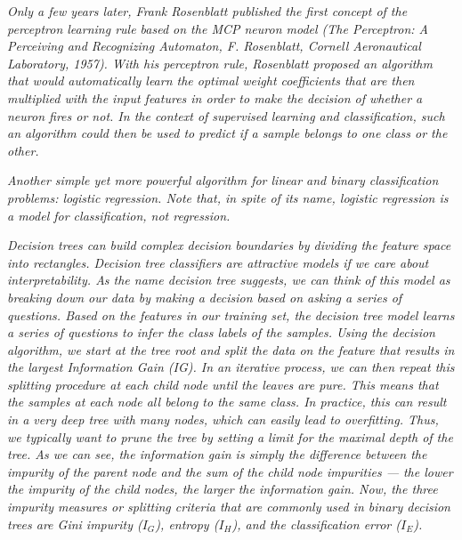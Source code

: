 \textit{Only a few years later, Frank Rosenblatt published the first concept of the perceptron learning rule based on the MCP neuron model (The Perceptron: A Perceiving and Recognizing Automaton, F. Rosenblatt, Cornell Aeronautical Laboratory, 1957). With his perceptron rule, Rosenblatt proposed an algorithm that would automatically learn the optimal weight coefficients that are then multiplied with the input features in order to make the decision of whether a neuron fires or not. In the context of supervised learning and classification, such an algorithm could then be used to predict if a sample belongs to one class or the other.}

\textit{Another simple yet more powerful algorithm for linear and binary classification problems: logistic regression. Note that, in spite of its name, logistic regression is a model for classification, not regression.}


\textit{Decision trees can build complex decision boundaries by dividing the feature space into rectangles. Decision tree classifiers are attractive models if we care about interpretability. As the name decision tree suggests, we can think of this model as breaking down our data by making a decision based on asking a series of questions. Based on the features in our training set, the decision tree model learns a series of questions to infer the class labels of the samples. Using the decision algorithm, we start at the tree root and split the data on the feature that results in the largest Information Gain (IG). In an iterative process, we can then repeat this splitting procedure at each child node until the leaves are pure. This means that the samples at each node all belong to the same class. In practice, this can result in a very deep tree with many nodes, which can easily lead to overfitting. Thus, we typically want to prune the tree by setting a limit for the maximal depth of the tree. As we can see, the information gain is simply the difference between the impurity of the parent node and the sum of the child node impurities — the lower the impurity of the child nodes, the larger the information gain. Now, the three impurity measures or splitting criteria that are commonly used in binary decision trees are Gini impurity ($I_G$), entropy ($I_H$), and the classification error ($I_E$).}

